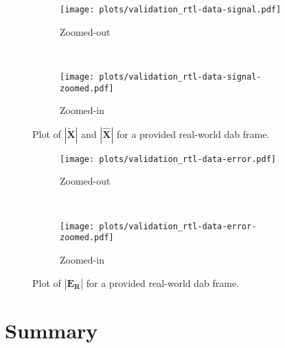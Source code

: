 \documentclass[class=report,11pt,crop=false]{standalone}
\begin{document}
\begin{figure}[htbp]
  \centering
  \captionsetup{type=figure}
  \begin{subfigure}[t]{\textwidth}
    \centering
    \captionsetup{type=figure}
    \texttt{[image: plots/validation\_rtl-data-signal.pdf]}
    \caption{Zoomed-out}
    \label{fig:validation_rtl-data-signal}
  \end{subfigure}%
  \\
  \begin{subfigure}[t]{\textwidth}
    \centering
    \captionsetup{type=figure}
    \texttt{[image: plots/validation\_rtl-data-signal-zoomed.pdf]}
    \caption{Zoomed-in}
    \label{fig:validation_rtl-data-signal-zoomed}
  \end{subfigure}
  \caption{Plot of \(|\mathbf{\tilde{X}}|\) and \(|\mathbf{\hat{X}}|\) for a provided real-world \gls{dab} frame.}
  \label{fig:validation_rtl-data}
\end{figure}



\begin{figure}[htbp]
  \centering
  \captionsetup{type=figure}
  \begin{subfigure}[t]{\textwidth}
    \centering
    \captionsetup{type=figure}
    \texttt{[image: plots/validation\_rtl-data-error.pdf]}
    \caption{Zoomed-out}
    \label{fig:validation_rtl-data-error}
  \end{subfigure}%
  \\
  \begin{subfigure}[t]{\textwidth}
    \centering
    \captionsetup{type=figure}
    \texttt{[image: plots/validation\_rtl-data-error-zoomed.pdf]}
    \caption{Zoomed-in}
    \label{fig:validation_rtl-data-error-zoomed}
  \end{subfigure}
  \caption{Plot of \(|\mathbf{E_R}|\) for a provided real-world \gls{dab} frame.}
  \label{fig:validation_rtl-error}
\end{figure}


\begin{figure}

\end{figure}


\section{Summary}

\ifstandalone

\printnoidxglossary[type=\acronymtype,nonumberlist]
\fi
\end{document}
